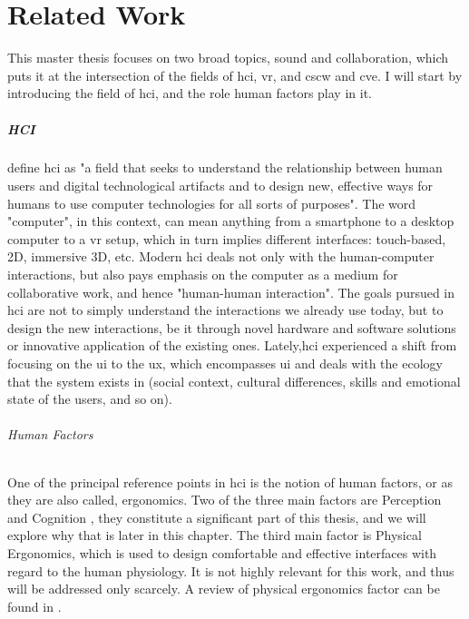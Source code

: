
\chapter{Related Work}
This master thesis focuses on two broad topics, sound and collaboration, which puts it at the intersection of the fields of \gls{hci}, \gls{vr}, and \gls{cscw} and \gls{cve}. I will start by introducing the field of \gls{hci}, and the role human factors play in it.

\paragraph{HCI}
\cite[Chapter~4.1.1]{jr_3d_2017} define \gls{hci} as "a field that seeks to understand the relationship between human users and digital technological artifacts and to design new, effective ways for humans to use computer technologies for all sorts of purposes". The word "computer", in this context, can mean anything from a smartphone to a desktop computer to a \gls{vr} setup, which in turn implies different interfaces: touch-based, 2D, immersive 3D, etc. Modern \gls{hci} deals not only with the human-computer interactions, but also pays emphasis on the computer as a medium for collaborative work, and hence "human-human interaction". The goals pursued in \gls{hci} are not to simply understand the interactions we already use today, but to design the new interactions, be it through novel hardware and software solutions or innovative application of the existing ones. Lately,\gls{hci} experienced a shift from focusing on the \gls{ui} to the \gls{ux}, which encompasses \gls{ui} and deals with the ecology that the system exists in (social context, cultural differences, skills and emotional state of the users, and so on).

\subparagraph{Human Factors}
One of the principal reference points in \gls{hci} is the notion of human factors, or as they are also called, ergonomics. Two of the three main factors are Perception and Cognition \cite{jr_3d_2017}, they constitute a significant part of this thesis, and we will explore why that is later in this chapter. The third main factor is Physical Ergonomics, which is used to design comfortable and effective interfaces with regard to the human physiology. It is not highly relevant for this work, and thus will be addressed only scarcely. A review of physical ergonomics factor can be found in \cite[Chapter~3.5]{jr_3d_2017}.

